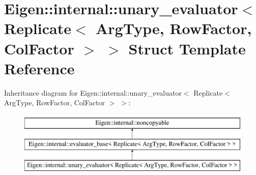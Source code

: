 \hypertarget{struct_eigen_1_1internal_1_1unary__evaluator_3_01_replicate_3_01_arg_type_00_01_row_factor_00_01_col_factor_01_4_01_4}{}\section{Eigen\+::internal\+::unary\+\_\+evaluator$<$ Replicate$<$ Arg\+Type, Row\+Factor, Col\+Factor $>$ $>$ Struct Template Reference}
\label{struct_eigen_1_1internal_1_1unary__evaluator_3_01_replicate_3_01_arg_type_00_01_row_factor_00_01_col_factor_01_4_01_4}
Inheritance diagram for Eigen\+::internal\+::unary\+\_\+evaluator$<$ Replicate$<$ Arg\+Type, Row\+Factor, Col\+Factor $>$ $>$\+:\begin{figure}[H]
\begin{center}
\leavevmode
\includegraphics[height=3.000000cm]{struct_eigen_1_1internal_1_1unary__evaluator_3_01_replicate_3_01_arg_type_00_01_row_factor_00_01_col_factor_01_4_01_4}
\end{center}
\end{figure}
